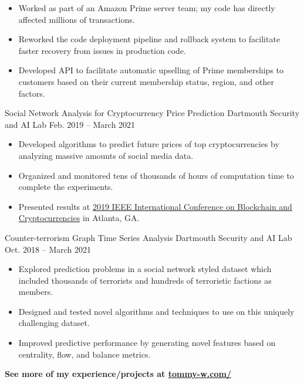 \documentclass[11pt]{resume}
\begin{document}
    \begin{itemize}
        \setlength{\itemindent}{-0.8em}
        \item Worked as part of an Amazon Prime server team; my code has directly affected millions of
            transactions.
        \item Reworked the code deployment pipeline and rollback system to facilitate faster recovery
            from issues in production code.
        \item Developed API to facilitate automatic upselling of Prime memberships to customers 
            based on their current membership status, region, and other factors.
    \end{itemize}

    \medskip

    \datedentry
        {Social Network Analysis for Cryptocurrency Price Prediction}
        {Dartmouth Security and AI Lab}
        {Feb. 2019 -- March 2021}
        {}
    
    \begin{itemize}
        \setlength{\itemindent}{-0.8em}
        \item Developed algorithms to predict future prices of top cryptocurrencies by analyzing massive amounts of
            social media data.
        \item Organized and monitored tens of thousands of hours of computation time to complete 
            the experiments.
        \item Presented results at \href{https://www.computer.org/csdl/proceedings/blockchain/2019/1gjS4tubCmI}
            {2019 IEEE International Conference on Blockchain and Cryptocurrencies} in Atlanta, GA.
    \end{itemize}

    \divider

    \datedentry
        {Counter-terrorism Graph Time Series Analysis}
        {Dartmouth Security and AI Lab}
        {Oct. 2018 -- March 2021}
        {}

    \begin{itemize}
        \setlength{\itemindent}{-0.8em}
        \item Explored prediction problems in a social network styled dataset which included thousands of terrorists and hundreds of 
            terroristic factions as members.
        \item Designed and tested novel algorithms and techniques to use on this uniquely challenging dataset.
        \item Improved predictive performance by generating novel features based on centrality, flow, and balance metrics.
    \end{itemize}

    \divider

    \large\bfseries See more of my experience/projects at \href{https://tommy-w.com/}{tommy-w.com/}
\end{document}
